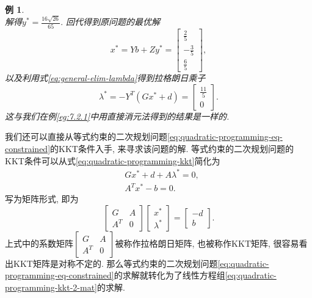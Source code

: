 \documentclass{SBCbookchapter}
\newtheorem{eg}[thm]{例}
\numberwithin{equation}{section}
\begin{document}
\begin{eg}
\begin{equation*}
\end{equation*}
解得$y^* = \frac{16 \sqrt{26}}{65}.$ 回代得到原问题的最优解
\begin{equation*}
x^* = Y b + Z y^* = \left[\begin{matrix} \frac{2}{5} \\ - \frac{3}{5} \\ \frac{6}{5} \end{matrix}\right],
\end{equation*}
以及利用式\eqref{eq:general-elim-lambda}得到拉格朗日乘子
\begin{equation*}
\lambda^* = - Y^T \left( Gx^* + d \right) = \left[\begin{matrix} \frac{11}{5} \\ 0 \end{matrix}\right].
\end{equation*}
这与我们在例\eqref{eg:7.2.1}中用直接消元法得到的结果是一样的.
\end{eg}

我们还可以直接从等式约束的二次规划问题\eqref{eq:quadratic-programming-eq-constrained}的KKT条件入手, 来寻求该问题的解. 等式约束的二次规划问题的KKT条件可以从式\eqref{eq:quadratic-programming-kkt}简化为
\begin{equation}
\label{eq:quadratic-programming-kkt-2}
\begin{aligned}
& G x^* + d + A \lambda^* = 0, \\
& A^T x^* - b = 0.
\end{aligned}
\end{equation}
写为矩阵形式, 即为
\begin{equation}
\label{eq:quadratic-programming-kkt-2-mat}
\begin{bmatrix} G & A \\ A^T & 0 \end{bmatrix} \begin{bmatrix} x^* \\ \lambda^* \end{bmatrix} = \begin{bmatrix} -d \\ b \end{bmatrix}.
\end{equation}
上式中的系数矩阵$\begin{bmatrix} G & A \\ A^T & 0 \end{bmatrix}$被称作拉格朗日矩阵, 也被称作KKT矩阵, 很容易看出KKT矩阵是对称不定的. 那么等式约束的二次规划问题\eqref{eq:quadratic-programming-eq-constrained}的求解就转化为了线性方程组\eqref{eq:quadratic-programming-kkt-2-mat}的求解.
\end{document}
